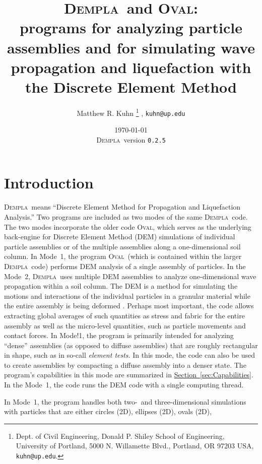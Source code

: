 \documentclass[letterpaper,11pt]{article}
\newcommand{\Oval}{\textsc{Oval}}
\newcommand{\Dempla}{\textsc{Dempla}}
\newcommand{\VersionB}{\texttt{0.2.5}}
\begin{document}
%
\title{\Dempla\ and \Oval:\\programs for analyzing
particle assemblies
and for simulating wave propagation and liquefaction
with the Discrete Element Method}
%
\author{
Matthew R. Kuhn%
\thanks{Dept. of Civil Engineering, Donald P. Shiley School of Engineering,
University of Portland,
5000 N. Willamette Blvd., Portland, OR 97203 USA,
\texttt{kuhn@up.edu}.}%
, \texttt{kuhn@up.edu}%
}
\date{\today\\ \Dempla\ version \VersionB}
%
\maketitle
%
\section{Introduction}
\Dempla\ means ``Discrete Element Method for Propagation
and Liquefaction Analysis.''
Two programs are included as two modes of the same \Dempla\ code.
The two modes incorporate the older code \Oval,
which serves as the underlying back-engine for
Discrete Element Method (DEM) simulations
of individual particle assemblies or of the
multiple assemblies along a one-dimensional
soil column.
In Mode~1,
the program \Oval\ 
(which is contained within the larger \Dempla\ code)
performs DEM analysis of a single assembly of particles.
In the Mode~2,
\Dempla\ uses multiple DEM assemblies to analyze
one-dimensional wave propagation within a soil column.
The DEM is a method for
simulating the motions and interactions of the individual particles
in a granular material while the entire assembly is 
being deformed \citep{Cundall:1979a}.
Perhaps most important, the code allows extracting global averages
of such quantities as stress and fabric for the entire assembly
as well as the micro-level quantities, such as particle movements and contact
forces.
In Mode!1,
the program is primarily intended for analyzing ``dense''
assemblies (as opposed to diffuse assemblies) 
that are roughly rectangular in shape, such as in so-call \emph{element tests}.
In this mode, the code
can also be used to create assemblies by
compacting a diffuse assembly into a denser state.
The program's capabilities in this mode are summarized in
\hyperref[sec:Capabilities]{Section~\ref*{sec:Capabilities}}.
In the Mode~1, the code runs the DEM code with a single
computing thread.
\par
In Mode~1,
the program handles both two-~and three-dimensional simulations
with particles that are either circles (2D), ellipses (2D), ovals (2D),
\end{document}
